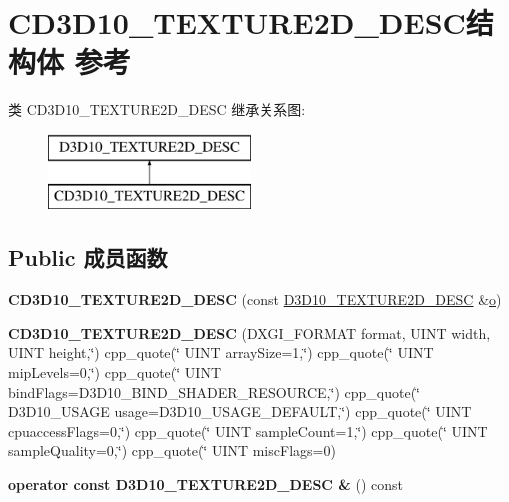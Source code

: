 \hypertarget{struct_c_d3_d10___t_e_x_t_u_r_e2_d___d_e_s_c}{}\section{C\+D3\+D10\+\_\+\+T\+E\+X\+T\+U\+R\+E2\+D\+\_\+\+D\+E\+S\+C结构体 参考}
\label{struct_c_d3_d10___t_e_x_t_u_r_e2_d___d_e_s_c}
类 C\+D3\+D10\+\_\+\+T\+E\+X\+T\+U\+R\+E2\+D\+\_\+\+D\+E\+SC 继承关系图\+:\begin{figure}[H]
\begin{center}
\leavevmode
\includegraphics[height=2.000000cm]{struct_c_d3_d10___t_e_x_t_u_r_e2_d___d_e_s_c}
\end{center}
\end{figure}
\subsection*{Public 成员函数}
\begin{DoxyCompactItemize}
\item 
\mbox{\label{struct_c_d3_d10___t_e_x_t_u_r_e2_d___d_e_s_c_a5812c7dce16034755ee7cfc1073d95b4}} 
{\bfseries C\+D3\+D10\+\_\+\+T\+E\+X\+T\+U\+R\+E2\+D\+\_\+\+D\+E\+SC} (const \hyperlink{struct_d3_d10___t_e_x_t_u_r_e2_d___d_e_s_c}{D3\+D10\+\_\+\+T\+E\+X\+T\+U\+R\+E2\+D\+\_\+\+D\+E\+SC} \&\hyperlink{opengl_2mesa_2main_2extensions_8c_ac02068cf344ef10efe2778c164d1233e}{o})
\item 
\mbox{\label{struct_c_d3_d10___t_e_x_t_u_r_e2_d___d_e_s_c_af4dada01a877471e6f333758c32d8b15}} 
{\bfseries C\+D3\+D10\+\_\+\+T\+E\+X\+T\+U\+R\+E2\+D\+\_\+\+D\+E\+SC} (D\+X\+G\+I\+\_\+\+F\+O\+R\+M\+AT format, U\+I\+NT width, U\+I\+NT height,\char`\"{})
cpp\+\_\+quote(\char`\"{} U\+I\+NT array\+Size=1,\char`\"{})
cpp\+\_\+quote(\char`\"{} U\+I\+NT mip\+Levels=0,\char`\"{})
cpp\+\_\+quote(\char`\"{} U\+I\+NT bind\+Flags=D3\+D10\+\_\+\+B\+I\+N\+D\+\_\+\+S\+H\+A\+D\+E\+R\+\_\+\+R\+E\+S\+O\+U\+R\+CE,\char`\"{})
cpp\+\_\+quote(\char`\"{} D3\+D10\+\_\+\+U\+S\+A\+GE usage=D3\+D10\+\_\+\+U\+S\+A\+G\+E\+\_\+\+D\+E\+F\+A\+U\+LT,\char`\"{})
cpp\+\_\+quote(\char`\"{} U\+I\+NT cpuaccess\+Flags=0,\char`\"{})
cpp\+\_\+quote(\char`\"{} U\+I\+NT sample\+Count=1,\char`\"{})
cpp\+\_\+quote(\char`\"{} U\+I\+NT sample\+Quality=0,\char`\"{})
cpp\+\_\+quote(\char`\"{} U\+I\+NT misc\+Flags=0)
\item 
\mbox{\label{struct_c_d3_d10___t_e_x_t_u_r_e2_d___d_e_s_c_acf494ee70258d1703ae801971b304089}} 
{\bfseries operator const D3\+D10\+\_\+\+T\+E\+X\+T\+U\+R\+E2\+D\+\_\+\+D\+E\+S\+C \&} () const
\end{DoxyCompactItemize}
